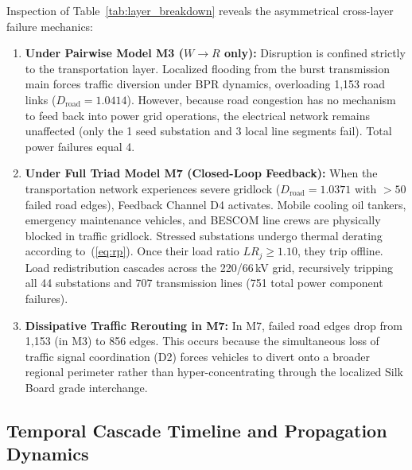 Inspection of Table~\ref{tab:layer_breakdown} reveals the asymmetrical cross-layer failure mechanics:
\begin{enumerate}
    \item \textbf{Under Pairwise Model M3 ($W \rightarrow R$ only):} Disruption is confined strictly to the transportation layer. Localized flooding from the burst transmission main forces traffic diversion under BPR dynamics, overloading 1,153 road links ($D_{\mathrm{road}} = 1.0414$). However, because road congestion has no mechanism to feed back into power grid operations, the electrical network remains unaffected (only the 1 seed substation and 3 local line segments fail). Total power failures equal 4.
    \item \textbf{Under Full Triad Model M7 (Closed-Loop Feedback):} When the transportation network experiences severe gridlock ($D_{\mathrm{road}} = 1.0371$ with $>50$ failed road edges), Feedback Channel D4 activates. Mobile cooling oil tankers, emergency maintenance vehicles, and BESCOM line crews are physically blocked in traffic gridlock. Stressed substations undergo thermal derating according to~(\ref{eq:rp}). Once their load ratio $LR_j \geq 1.10$, they trip offline. Load redistribution cascades across the 220/66\,kV grid, recursively tripping all 44 substations and 707 transmission lines (751 total power component failures).
    \item \textbf{Dissipative Traffic Rerouting in M7:} In M7, failed road edges drop from 1,153 (in M3) to 856 edges. This occurs because the simultaneous loss of traffic signal coordination (D2) forces vehicles to divert onto a broader regional perimeter rather than hyper-concentrating through the localized Silk Board grade interchange.
\end{enumerate}

\subsection{Temporal Cascade Timeline and Propagation Dynamics}

